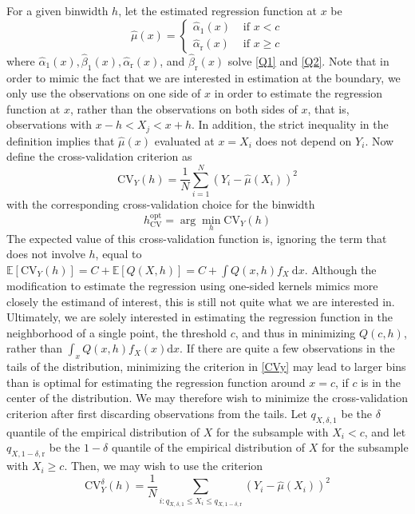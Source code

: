 \documentclass[11pt]{book}%
\begin{document}
For a given binwidth $h$, let the estimated regression function at $x$ be
$$
\hat{\mu}(x)= \begin{cases}\hat{\alpha}_{1}(x) & \text { if } x<c \\ \hat{\alpha}_{\mathrm{r}}(x) & \text { if } x \geqslant c\end{cases}
$$
where $\hat{\alpha}_{1}(x), \hat{\beta}_{1}(x), \hat{\alpha}_{\mathrm{r}}(x)$, and $\hat{\beta}_{\mathrm{r}}(x)$ solve \ref{Q1} and \ref{Q2}. Note that in order to mimic the fact that we are interested in estimation at the boundary, we only use the observations on one side of $x$ in order to estimate the regression function at $x$, rather than the observations on both sides of $x$, that is, observations with $x-h<X_{j}<x+h .$ In addition, the strict inequality in the definition implies that $\hat{\mu}(x)$ evaluated at $x=X_{i}$ does not depend on $Y_{i}$. Now define the cross-validation criterion as
\begin{equation}\label{CVy}
\mathrm{CV}_{Y}(h)=\frac{1}{N} \sum_{i=1}^{N}\left(Y_{i}-\hat{\mu}\left(X_{i}\right)\right)^{2}
\end{equation}
with the corresponding cross-validation choice for the binwidth
$$
h_{\mathrm{CV}}^{\mathrm{opt}}=\arg \min _{h} \mathrm{CV}_{Y}(h)
$$
The expected value of this cross-validation function is, ignoring the term that does not involve $h$, equal to $\mathbb{E}\left[\mathrm{CV}_{Y}(h)\right]=C+\mathbb{E}[Q(X, h)]=C+\int Q(x, h) f_{X} \mathrm{~d} x .$ Although the modification to estimate the regression
using one-sided kernels mimics more closely the estimand of interest, this is still not quite what we are interested in. Ultimately, we are solely interested in estimating the regression function in the neighborhood of a single point, the threshold $c$, and thus in minimizing $Q(c, h)$, rather than $\int_{x} Q(x, h) f_{X}(x) \mathrm{d} x$. If there are quite a few observations in the tails of the distribution, minimizing the criterion in \ref{CVy} may lead to larger bins than is optimal for estimating the regression function around $x=c$, if $c$ is in the center of the distribution. We may therefore wish to minimize the cross-validation criterion after first discarding observations from the tails. Let $q_{X, \delta, 1}$ be the $\delta$ quantile of the empirical distribution of $X$ for the subsample with $X_{i}<c$, and let $q_{X, 1-\delta, \mathrm{r}}$ be the $1-\delta$ quantile of the empirical distribution of $X$ for the subsample with $X_{i} \geqslant c$. Then, we may wish to use the criterion
$$
\mathrm{CV}_{Y}^{\delta}(h)=\frac{1}{N} \sum_{i: q_{X, \delta, 1} \leqslant X_{i} \leqslant q_{X, 1-\delta, \mathrm{r}}}\left(Y_{i}-\hat{\mu}\left(X_{i}\right)\right)^{2}
$$
\end{document}
